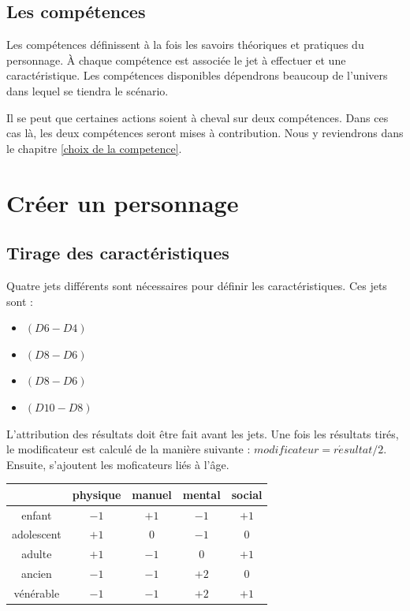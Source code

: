 \documentclass[oneside,12pt]{article}
\begin{document}
\subsection{Les comp\'etences}
Les comp\'etences d\'efinissent \`a la fois les savoirs th\'eoriques et pratiques du personnage.
\`A chaque comp\'etence est associ\'ee le jet \`a effectuer et une caract\'eristique.
Les comp\'etences disponibles d\'ependrons beaucoup de l'univers dans lequel se tiendra le sc\'enario.

Il se peut que certaines actions soient \`a cheval sur deux comp\'etences.
Dans ces cas l\`a, les deux comp\'etences seront mises \`a contribution.
Nous y reviendrons dans le chapitre \ref{choix de la competence}.
\newpage
\section{Cr\'eer un personnage}
\subsection{Tirage des caract\'eristiques}
Quatre jets diff\'erents sont n\'ecessaires pour d\'efinir les caract\'eristiques.
Ces jets sont :
\begin{itemize}
\item
  $(D6 - D4)$
\item
  $(D8 - D6)$
\item
  $(D8 - D6)$
\item
  $(D10 - D8)$
\end{itemize}

L'attribution des r\'esultats doit \^etre fait avant les jets.
Une fois les r\'esultats tir\'es, le modificateur est calcul\'e de la mani\`ere suivante : $ modificateur = r\acute{e}sultat / 2 $.
Ensuite, s'ajoutent les moficateurs li\'es \`a l'\^age.

\begin{tabular}{| c | c | c | c | c |}
  \hline
  & physique & manuel & mental & social \\
  \hline
  enfant & $-1$ & $+1$ & $-1$ & $+1$ \\
  \hline
  adolescent & $+1$ & $0$ & $-1$ & $0$ \\
  \hline
  adulte & $+1$ & $-1$ & $0$ & $+1$ \\
  \hline
  ancien & $-1$ & $-1$ & $+2$ & $0$ \\
  \hline
  v\'en\'erable & $-1$ & $-1$ & $+2$ & $+1$ \\
  \hline
\end{tabular}
\end{document}
